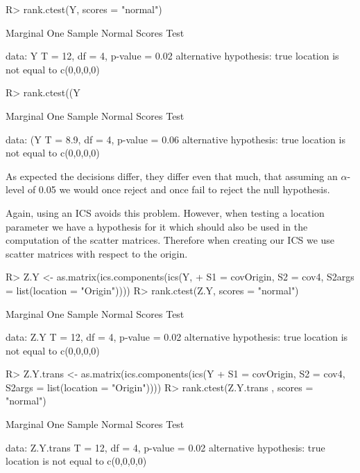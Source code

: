 \documentclass[article,nojss]{jss}
\begin{document}
\begin{Schunk}
\begin{Sinput}
R> rank.ctest(Y, scores = "normal")
\end{Sinput}
\begin{Soutput}
	Marginal One Sample Normal Scores Test

data:  Y
T = 12, df = 4, p-value = 0.02
alternative hypothesis: true location is not equal to c(0,0,0,0)
\end{Soutput}
\begin{Sinput}
R> rank.ctest((Y %
\end{Sinput}
\begin{Soutput}
	Marginal One Sample Normal Scores Test

data:  (Y %
T = 8.9, df = 4, p-value = 0.06
alternative hypothesis: true location is not equal to c(0,0,0,0)
\end{Soutput}
\end{Schunk}
As expected the decisions differ, they differ even that much, that assuming an $\alpha$-level of 0.05 we would once reject and once fail to reject
the null hypothesis.

Again, using an ICS avoids this problem. However, when testing a location parameter we have a hypothesis for it which should also be used in the computation
of the scatter matrices. Therefore when creating our ICS we use scatter matrices with respect to the origin.
\begin{Schunk}
\begin{Sinput}
R> Z.Y <- as.matrix(ics.components(ics(Y,
+    S1 = covOrigin, S2 = cov4, S2args = list(location = "Origin"))))
R> rank.ctest(Z.Y, scores = "normal")
\end{Sinput}
\begin{Soutput}
	Marginal One Sample Normal Scores Test

data:  Z.Y
T = 12, df = 4, p-value = 0.02
alternative hypothesis: true location is not equal to c(0,0,0,0)
\end{Soutput}
\begin{Sinput}
R> Z.Y.trans <- as.matrix(ics.components(ics(Y %
+    S1 = covOrigin, S2 = cov4, S2args = list(location = "Origin"))))
R> rank.ctest(Z.Y.trans , scores = "normal")
\end{Sinput}
\begin{Soutput}
	Marginal One Sample Normal Scores Test

data:  Z.Y.trans
T = 12, df = 4, p-value = 0.02
alternative hypothesis: true location is not equal to c(0,0,0,0)
\end{Soutput}
\end{Schunk}
\end{document}
